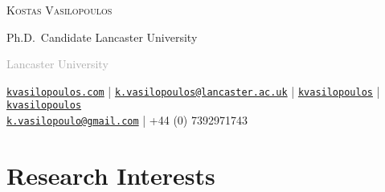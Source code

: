 \documentclass[10pt,]{article}
\begin{document}
              
              
              \centerline{\huge \scshape Kostas Vasilopoulos} %
              
              \vspace{2 mm}
              
              \centerline{\normalsize Ph.D.~Candidate Lancaster
University}
              
              \vspace{2 mm}
              
              
              \centerline{\normalsize \textcolor{darkgray}{Lancaster
University}}
              
              \begin{center}
                \small
                \faGlobe \hspace{1mm} \href{http://kvasilopoulos.com}{\tt kvasilopoulos.com} \hspace{1mm} | 
                \hspace{1mm}  \faEnvelope \hspace{1mm} \href{mailto:}{\tt \href{mailto:k.vasilopoulos@lancaster.ac.uk}{\nolinkurl{k.vasilopoulos@lancaster.ac.uk}}} \hspace{1mm} | \hspace{1mm} \faGithub \hspace{1mm} \href{http://github.com/kvasilopoulos}{\tt kvasilopoulos} |
                \faLinkedin \hspace{1mm} \href{https://www.linkedin.com/in/kostas-vasilopoulos-130718128/}{\tt kvasilopoulos}
                \\ \vspace{2mm}
                \faEnvelopeO \hspace{1mm} \href{mailto:}{\tt \href{mailto:k.vasilopoulo@gmail.com}{\nolinkurl{k.vasilopoulo@gmail.com}}} \hspace{1mm} | \hspace{1mm} \faPhone +44
(0) 7392971743
              \end{center}
              
              \vspace{2 mm}
           
              
              \hypertarget{research-interests}{%
              \section{Research Interests}\label{research-interests}}
\end{document}
